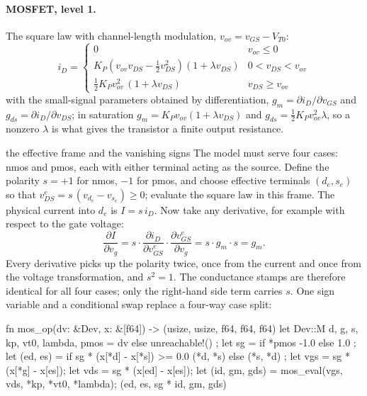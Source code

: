 \documentclass[11pt]{article}
\begin{document}
\paragraph{MOSFET, level 1.}
The square law with channel-length modulation,
$v_{ov} = v_{GS} - V_{T0}$:
\[
i_D = \begin{cases}
0 & v_{ov} \le 0 \\[2pt]
K_P \left( v_{ov} v_{DS} - \tfrac{1}{2} v_{DS}^2 \right)(1 + \lambda v_{DS})
  & 0 < v_{DS} < v_{ov} \\[2pt]
\tfrac{1}{2} K_P v_{ov}^2 \,(1 + \lambda v_{DS}) & v_{DS} \ge v_{ov}
\end{cases}
\]
with the small-signal parameters obtained by differentiation,
$g_m = \partial i_D / \partial v_{GS}$ and
$g_{ds} = \partial i_D / \partial v_{DS}$; in saturation
$g_m = K_P v_{ov} (1 + \lambda v_{DS})$ and
$g_{ds} = \tfrac{1}{2} K_P v_{ov}^2 \lambda$, so a nonzero $\lambda$ is
what gives the transistor a finite output resistance.

\begin{derivation}{the effective frame and the vanishing signs}
The model must serve four cases: nmos and pmos, each with either terminal
acting as the source. Define the polarity $s = +1$ for nmos, $-1$ for
pmos, and choose effective terminals $(d_e, s_e)$ so that
$v_{DS}^{e} = s\,(v_{d_e} - v_{s_e}) \ge 0$; evaluate the square law in
this frame. The physical current into $d_e$ is $I = s\, i_D$. Now take
any derivative, for example with respect to the gate voltage:
\[
\frac{\partial I}{\partial v_g}
 = s \cdot \frac{\partial i_D}{\partial v_{GS}^{e}}
     \cdot \frac{\partial v_{GS}^{e}}{\partial v_g}
 = s \cdot g_m \cdot s = g_m .
\]
Every derivative picks up the polarity twice, once from the current and
once from the voltage transformation, and $s^2 = 1$. The conductance
stamps are therefore identical for all four cases; only the right-hand
side term carries $s$. One sign variable and a conditional swap replace a
four-way case split:
\end{derivation}

\begin{rust}
fn mos_op(dv: &Dev, x: &[f64]) -> (usize, usize, f64, f64, f64) {
    let Dev::M { d, g, s, kp, vt0, lambda, pmos } = dv else { unreachable!() };
    let sg = if *pmos { -1.0 } else { 1.0 };
    let (ed, es) = if sg * (x[*d] - x[*s]) >= 0.0 { (*d, *s) } else { (*s, *d) };
    let vgs = sg * (x[*g] - x[es]);
    let vds = sg * (x[ed] - x[es]);
    let (id, gm, gds) = mos_eval(vgs, vds, *kp, *vt0, *lambda);
    (ed, es, sg * id, gm, gds)
}
\end{rust}
\end{document}
